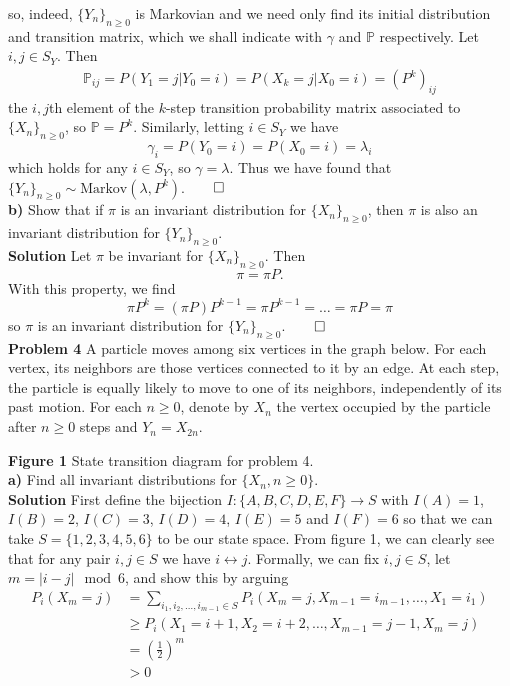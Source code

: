 \documentclass[11pt, letterpaper]{article}
\newcommand{\mbb}[1]{\mathbb{#1}}
\begin{document}
    so, indeed, $\{Y_n\}_{n\geq 0}$ is Markovian and we need only find its initial distribution and transition matrix, which we shall indicate with $\gamma$ and $\mbb{P}$ respectively.
    Let $i,j\in S_Y$. Then
    \begin{align*}
        \mbb{P}_{ij}=P(Y_1=j|Y_0=i)=P(X_k=j|X_0=i)=(P^k)_{ij}
    \end{align*}
    the $i,j$th element of the $k$-step transition probability matrix associated to $\{X_n\}_{n\geq 0}$, so $\mbb{P}=P^k$. Similarly, letting $i\in S_Y$ we have
    \[\gamma_i=P(Y_0=i)=P(X_0=i)=\lambda_i\]
    which holds for any $i\in S_Y$, so $\gamma=\lambda$. Thus we have found that $\{Y_n\}_{n\geq 0}\sim\text{Markov}(\lambda,P^k)$.\hfill{$\qed$}\\[10pt]
    {\bf b)} Show that if $\pi$ is an invariant distribution for $\{X_n\}_{n\geq 0}$, then $\pi$ is also an invariant distribution for $\{Y_n\}_{n\geq 0}$.\\[10pt]
    {\bf Solution} Let $\pi$ be invariant for $\{X_n\}_{n\geq 0}$. Then
    \[\pi=\pi P.\]
    With this property, we find
    \[\pi P^k=(\pi P)P^{k-1}=\pi P^{k-1}=\dots=\pi P=\pi\]
    so $\pi$ is an invariant distribution for $\{Y_n\}_{n\geq 0}$.\hfill{$\qed$}\\[10pt]
    {\bf Problem 4} A particle moves among six vertices in the graph below. For each vertex, its neighbors are those vertices connected to it by an edge. At each step, the particle
    is equally likely to move to one of its neighbors, independently of its past motion. For each $n\geq 0$, denote by $X_n$ the vertex occupied by the particle after $n\geq 0$ steps and $Y_n=X_{2n}$.
    \begin{center}
    \end{center}
    {\bf Figure 1} State transition diagram for problem 4.\\[10pt]
    {\bf a)} Find all invariant distributions for $\{X_n,n\geq 0\}$.\\[10pt]
    {\bf Solution} First define the bijection $I:\{A,B,C,D,E,F\}\rightarrow S$ with $I(A)=1$, $I(B)=2$, $I(C)=3$, $I(D)=4$, $I(E)=5$ and $I(F)=6$ so that we can take $S=\{1,2,3,4,5,6\}$ to be our state space. From figure 1, we can clearly see that for any pair $i,j\in S$ we have $i\longleftrightarrow j$. Formally,
    we can fix $i,j\in S$, let $m=|i-j| \mod 6$, and show this by arguing
    \begin{align*}
    P_i(X_m=j)&=\sum_{i_1,i_2,\dots,i_{m-1}\in S}P_i(X_m=j, X_{m-1}=i_{m-1},\dots,X_1=i_1)\\
    &\geq P_i(X_1=i+1,X_2=i+2,\dots, X_{m-1}=j-1, X_m=j)\\
    &=\left(\frac{1}{2}\right)^m\\
    &>0
    \end{align*}
\end{document}
